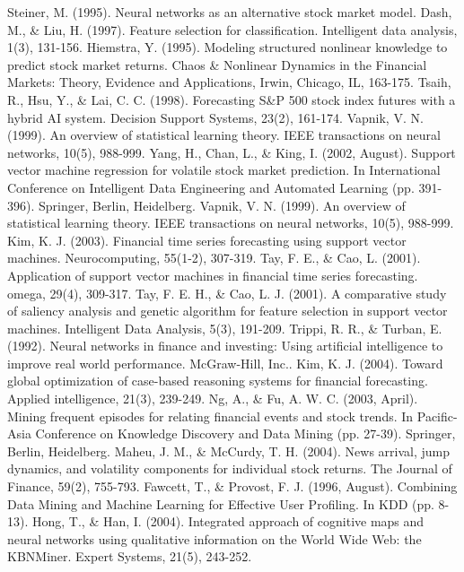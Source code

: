 \documentclass[a4paper,12pt]{report}
\begin{document}
\begin{fig}
\begin{thebibliography}{9}
	Steiner, M. (1995). Neural networks as an alternative stock market model.
	Dash, M., \& Liu, H. (1997). Feature selection for classification. Intelligent data analysis, 1(3), 131-156.
	Hiemstra, Y. (1995). Modeling structured nonlinear knowledge to predict stock market returns. Chaos \& Nonlinear Dynamics in the Financial Markets: Theory, Evidence and Applications, Irwin, Chicago, IL, 163-175.
	Tsaih, R., Hsu, Y., \& Lai, C. C. (1998). Forecasting S\&P 500 stock index futures with a hybrid AI system. Decision Support Systems, 23(2), 161-174.
	Vapnik, V. N. (1999). An overview of statistical learning theory. IEEE transactions on neural networks, 10(5), 988-999.
	Yang, H., Chan, L., \& King, I. (2002, August). Support vector machine regression for volatile stock market prediction. In International Conference on Intelligent Data Engineering and Automated Learning (pp. 391-396). Springer, Berlin, Heidelberg.
	Vapnik, V. N. (1999). An overview of statistical learning theory. IEEE transactions on neural networks, 10(5), 988-999.
	Kim, K. J. (2003). Financial time series forecasting using support vector machines. Neurocomputing, 55(1-2), 307-319.
	Tay, F. E., \& Cao, L. (2001). Application of support vector machines in financial time series forecasting. omega, 29(4), 309-317.
	Tay, F. E. H., \& Cao, L. J. (2001). A comparative study of saliency analysis and genetic algorithm for feature selection in support vector machines. Intelligent Data Analysis, 5(3), 191-209.
	Trippi, R. R., \& Turban, E. (1992). Neural networks in finance and investing: Using artificial intelligence to improve real world performance. McGraw-Hill, Inc..
	Kim, K. J. (2004). Toward global optimization of case-based reasoning systems for financial forecasting. Applied intelligence, 21(3), 239-249.
	Ng, A., \& Fu, A. W. C. (2003, April). Mining frequent episodes for relating financial events and stock trends. In Pacific-Asia Conference on Knowledge Discovery and Data Mining (pp. 27-39). Springer, Berlin, Heidelberg.
	Maheu, J. M., \& McCurdy, T. H. (2004). News arrival, jump dynamics, and volatility components for individual stock returns. The Journal of Finance, 59(2), 755-793.
	Fawcett, T., \& Provost, F. J. (1996, August). Combining Data Mining and Machine Learning for Effective User Profiling. In KDD (pp. 8-13).
	Hong, T., \& Han, I. (2004). Integrated approach of cognitive maps and neural networks using qualitative information on the World Wide Web: the KBNMiner. Expert Systems, 21(5), 243-252.

\end{thebibliography}
\end{fig}
\end{document}
